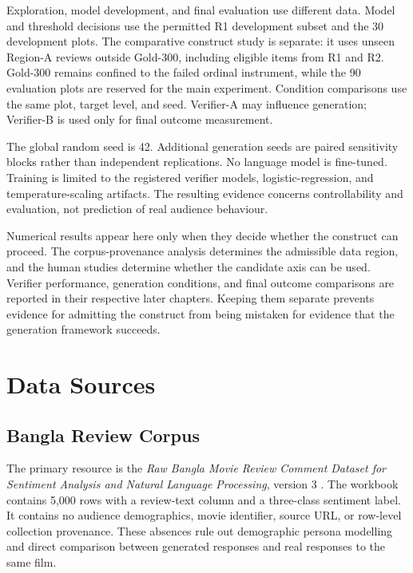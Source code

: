 Exploration, model development, and final evaluation use different data. Model and threshold decisions use the permitted R1 development subset and the 30 development plots. The comparative construct study is separate: it uses unseen Region-A reviews outside Gold-300, including eligible items from R1 and R2. Gold-300 remains confined to the failed ordinal instrument, while the 90 evaluation plots are reserved for the main experiment. Condition comparisons use the same plot, target level, and seed. Verifier-A may influence generation; Verifier-B is used only for final outcome measurement.

The global random seed is 42. Additional generation seeds are paired sensitivity blocks rather than independent replications. No language model is fine-tuned. Training is limited to the registered verifier models, logistic-regression, and temperature-scaling artifacts. The resulting evidence concerns controllability and evaluation, not prediction of real audience behaviour.

Numerical results appear here only when they decide whether the construct can proceed. The corpus-provenance analysis determines the admissible data region, and the human studies determine whether the candidate axis can be used. Verifier performance, generation conditions, and final outcome comparisons are reported in their respective later chapters. Keeping them separate prevents evidence for admitting the construct from being mistaken for evidence that the generation framework succeeds.

\section{Data Sources}
\label{sec:ch3-data-sources}

\subsection{Bangla Review Corpus}
\label{subsec:ch3-bangla-review-corpus}

The primary resource is the \textit{Raw Bangla Movie Review Comment Dataset for Sentiment Analysis and Natural Language Processing}, version 3 \cite{b4}. The workbook contains 5,000 rows with a review-text column and a three-class sentiment label. It contains no audience demographics, movie identifier, source URL, or row-level collection provenance. These absences rule out demographic persona modelling and direct comparison between generated responses and real responses to the same film.

